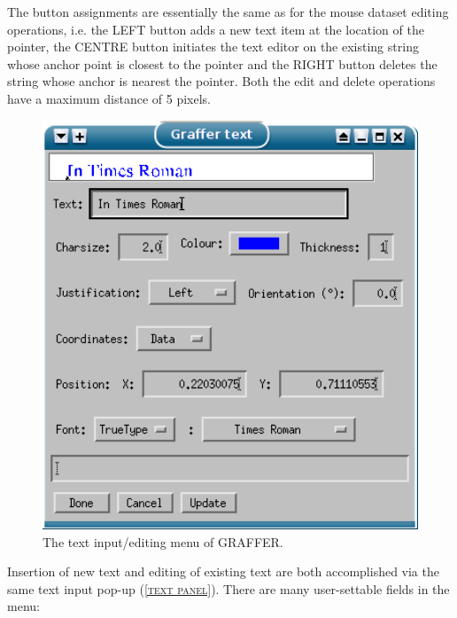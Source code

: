 \documentclass[11pt,twoside,english]{article}
\begin{document}
The button assignments are essentially the same as for the mouse
dataset editing operations, i.e. the LEFT button adds a new text item
at the location of the pointer, the CENTRE button initiates the text
editor on the existing string whose anchor point is closest to the
pointer and the RIGHT button deletes the string whose anchor is nearest
the pointer. Both the edit and delete operations have a maximum
distance of 5 pixels.
\begin{figure}[htbp]
  \centering
  \includegraphics[width=12cm]{Text}
  \caption{The text input/editing menu of GRAFFER.}
  \label{text panel}
\end{figure}
Insertion of new text and editing of existing text are both
accomplished via the same text input pop-up (\textsc{\autoref{text
    panel}}). There are many user-settable fields in the menu:
\end{document}
